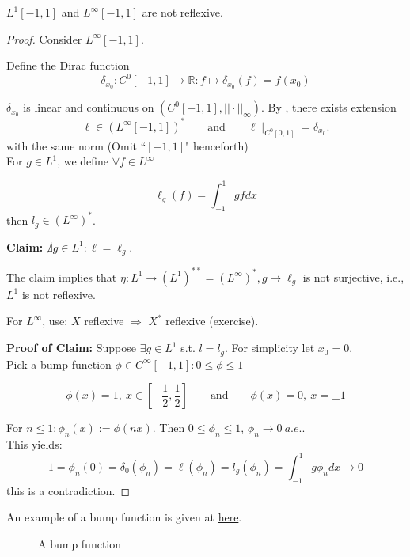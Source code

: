 \documentclass{article}
\begin{document}
\begin{proposition}
    $L^1[-1,1]$ and $L^{\infty}[-1,1]$ are not reflexive.
\end{proposition}
\begin{proof}
Consider $L^\infty[-1,1]$. 

Define the Dirac function 
$$\delta_{x_0}: C^0[-1,1] \rightarrow \mathbb{R}: f \mapsto \delta_{x_0}(f) = f(x_0)$$

$\delta_{x_0}$ is linear and continuous on $(C^0[-1,1],||\cdot ||_\infty)$. By , there exists extension 
$$\ell\in (L^\infty [-1,1])^* \qquad \text{and} \qquad \ell\mid_{C^0[0,1]} = \delta_{x_0}.$$
with the same norm (Omit \textquotedblleft $[-1,1]$" henceforth) \\

For $g\in L^1$, we define $\forall f\in L^\infty$

$$\ell_g(f) = \int_{-1}^1 gf dx$$
then $l_g\in (L^\infty)^*$.


\textbf{Claim:} $\nexists g\in L^1: \ell=\ell_g$.  

The claim implies that $\eta: L^1 \rightarrow (L^1)^{**}=(L^\infty)^*, g \mapsto \ell_g$ is not surjective, i.e., $L^1$ is not reflexive.  

For $L^\infty$, use: $X$ reflexive $\Rightarrow$ $X^*$ reflexive (exercise).  

\textbf{Proof of Claim:} Suppose $\exists g\in L^1$ s.t. $l=l_g$. For simplicity let $x_0=0$.\\
Pick a bump function $\phi \in C^\infty [-1,1]: 0 \leq \phi \leq 1$

$$
\phi(x) = 1, \ x \in [-\frac{1}{2}, \frac{1}{2}] \qquad \text{and} \qquad \phi(x)=0, \ x=\pm 1
$$

For $n\leq 1: \phi_n(x) := \phi(nx)$. Then $0\leq \phi_n \leq 1$, $\phi_n \rightarrow 0 \ a.e.$.\\
This yields: $$1 = \phi_n(0)=\delta_{0}(\phi_n) = \ell(\phi_n) = l_g(\phi_n) = \int_{-1}^1 g\phi_n dx \rightarrow 0$$
this is a contradiction.
\end{proof}
\begin{unexaminable}
    An example of a bump function is given at \href{https://math.stackexchange.com/questions/101480/are-there-other-kinds-of-bump-functions-than-e-frac1x2-1}{\color{navyblue} here}.  
\begin{figure}[H]
  \centering
  \makebox[0pt]{%
  
  }
  \caption{A bump function}
\end{figure} 
\end{unexaminable}
\end{document}
